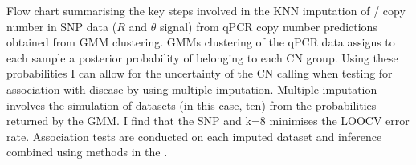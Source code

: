 {Flow chart summarising the key steps involved in the KNN imputation of / copy number in SNP data
($R$ and $\theta$ signal) from qPCR copy number predictions obtained from GMM clustering.}
{
\Glspl{GMM} clustering of the qPCR data assigns to each sample a posterior probability of belonging to each \gls{CN} group.
Using these probabilities I can allow for the uncertainty of the CN calling when testing for association with disease by using multiple imputation.
Multiple imputation involves the simulation of datasets (in this case, ten) from the probabilities returned by the GMM.
I find that the SNP  and k=8 minimises the \Gls{LOOCV} error rate.  
Association tests are conducted on each imputed dataset and inference combined using methods in the .
}



%
%


